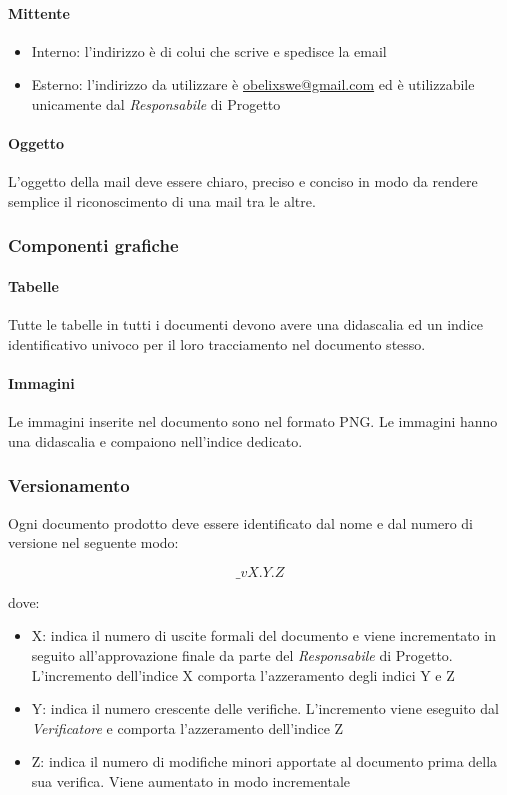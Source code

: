 \paragraph{Mittente}
\begin{itemize}
\item Interno: l’indirizzo è di colui che scrive e spedisce la email
\item Esterno: l’indirizzo da utilizzare è \href{mailto:obelixswe@gmail.com}{obelixswe@gmail.com} ed è utilizzabile unicamente dal  \emph{Responsabile}  di Progetto
\end{itemize}
\paragraph{Oggetto}

L’oggetto della mail deve essere chiaro, preciso e conciso in modo da rendere semplice il riconoscimento di una mail tra le altre.


\subsubsection{Componenti grafiche}

\paragraph{Tabelle }

Tutte le tabelle in tutti i documenti devono avere una didascalia ed
un indice identificativo univoco per il loro tracciamento nel
documento stesso. 

\paragraph{Immagini }

Le immagini inserite nel documento sono nel formato PNG. Le immagini hanno una didascalia e compaiono nell'indice dedicato.

\subsubsection{Versionamento}

Ogni documento prodotto deve essere identificato dal nome e dal numero di versione nel seguente modo:

$$ \_vX.Y.Z $$



dove:
\begin{itemize}
\item  X: indica il numero di uscite formali del documento e viene incrementato in seguito all’approvazione finale da parte del  \emph{Responsabile}  di Progetto.
L’incremento dell’indice X comporta l’azzeramento degli indici Y e Z

\item  Y: indica il numero crescente delle verifiche. L’incremento viene eseguito dal  \emph{Verificatore}  e comporta l’azzeramento dell’indice Z

\item  Z: indica il numero di modifiche minori apportate al documento prima della sua verifica. Viene aumentato in modo incrementale
\end{itemize}

